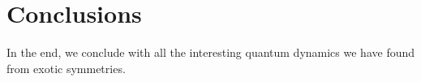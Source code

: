 
\chapter{Conclusions}
\label{chp:conclusion}

In the end, we conclude with all the interesting quantum dynamics we have found from exotic symmetries.
